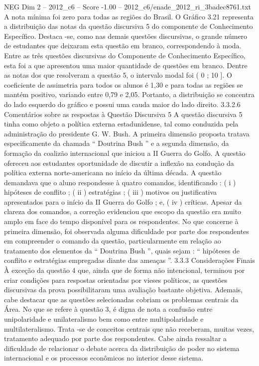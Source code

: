 \begin{textsample}{NEG Dim 2 – 2012\_c6 – Score -1.00 – 2012\_c6/enade\_2012\_ri\_3badec8761.txt}
A nota mínima foi zero para todas as regiões do Brasil.
O Gráfico 3.21 representa a distribuição das notas da questão discursiva 5 do componente de Conhecimento Específico.
Destaca -se, como nas demais questões discursivas, o grande número de estudantes que deixaram esta questão em branco, correspondendo à moda.
Entre as três questões discursivas do Componente de Conhecimento Específico, esta foi a que apresentou uma maior quantidade de questões em branco.
Dentre as notas dos que resolveram a questão 5, o intervalo modal foi ( 0 ; 10 ].
O coeficiente de assimetria para todos os alunos é 1,30 e para todas as regiões se mantém positivo, variando entre 0,79 e 2,05.
Portanto, a distribuição se concentra do lado esquerdo do gráfico e possui uma cauda maior do lado direito. 3.3.2.6 Comentários sobre as respostas à Questão Discursiva 5 A questão discursiva 5 tinha como objeto a política externa estadunidense, tal como conduzida pela administração do presidente G.
W.
Bush.
A primeira dimensão proposta tratava especificamente da chamada “ Doutrina Bush ” e a segunda dimensão, da formação da coalizão internacional que iniciou a II Guerra do Golfo.
A questão ofereceu aos estudantes oportunidade de discutir a inflexão na condução da política externa norte-americana no início da última década.
A questão demandava que o aluno respondesse à quatro comandos, identificando : ( i ) hipóteses de conflito ; ( ii ) estratégias ; ( iii ) motivos ou justificativa apresentados para o início da II Guerra do Golfo ; e, ( iv ) críticas.
Apesar da clareza dos comandos, a correção evidenciou que escopo da questão era muito amplo em face do tempo disponível para os respondentes.
No que concerne à primeira dimensão, foi observada alguma dificuldade por parte dos respondentes em compreender o comando da questão, particularmente em relação ao tratamento dos elementos da “ Doutrina Bush ”, quais sejam : “ hipóteses de conflito e estratégias empregadas diante das ameaças ”. 3.3.3 Considerações Finais À exceção da questão 4 que, ainda que de forma não intencional, terminou por criar condições para respostas orientadas por vieses políticos, as questões discursivas da prova possibilitaram uma avaliação bastante objetiva.
Ademais, cabe destacar que as questões selecionadas cobriam os problemas centrais da Área.
No que se refere à questão 3, é digna de nota a confusão entre unipolaridade e unilateralismo bem como entre multipolaridade e multilateralismo.
Trata -se de conceitos centrais que não receberam, muitas vezes, tratamento adequado por parte dos respondentes.
Cabe ainda ressaltar a dificuldade de relacionar o debate acerca da distribuição de poder no sistema internacional e os processos econômicos no interior desse sistema.

\end{textsample}
